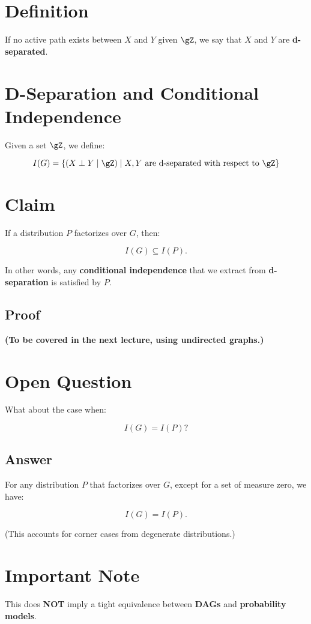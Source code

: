 \documentclass{article}%
\begin{document}
\section*{Definition}
If no active path exists between \( X \) and \( Y \) given \( \gZ \), we say that \( X \) and \( Y \) are \textbf{d-separated}.


\section*{D-Separation and Conditional Independence}

Given a set \( \gZ \), we define:

\[
I(G) = \left\{ (X \perp Y \mid \gZ) \mid X, Y \text{ are d-separated with respect to } \gZ \right\}
\]

\section*{Claim}
If a distribution \( P \) factorizes over \( G \), then:

\[
I(G) \subseteq I(P).
\]

In other words, any \textbf{conditional independence} that we extract from \textbf{d-separation} is satisfied by \( P \).

\subsection*{Proof}
\textbf{(To be covered in the next lecture, using undirected graphs.)}

\section*{Open Question}
What about the case when:

\[
I(G) = I(P)?
\]

\subsection*{Answer}
For any distribution \( P \) that factorizes over \( G \), except for a set of measure zero, we have:

\[
I(G) = I(P).
\]

(This accounts for corner cases from degenerate distributions.)

\section*{Important Note}
This does \textbf{NOT} imply a tight equivalence between \textbf{DAGs} and \textbf{probability models}.
\end{document}
